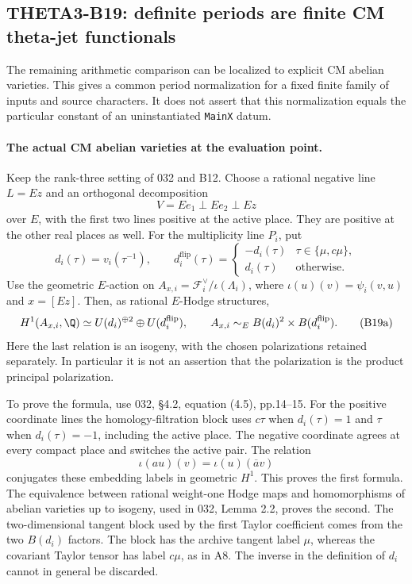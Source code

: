 \subsection{THETA3-B19: definite periods are finite CM theta-jet functionals}\label{B19}

The remaining arithmetic comparison can be localized to explicit CM
abelian varieties.  This gives a common period normalization for a
fixed finite family of inputs and source characters.  It does not
assert that this normalization equals the particular constant of an
uninstantiated \texttt{MainX} datum.

\paragraph{The actual CM abelian varieties at the evaluation point.}
Keep the rank-three setting of 032 and B12.  Choose a rational
negative line $L=Ez$ and an orthogonal decomposition
\[
 V=Ee_1\perp Ee_2\perp Ez
\]
over $E$, with the first two lines positive at the active place.
They are positive at the other real places as well.  For the
multiplicity line $P_i$, put
\[
 d_i(\tau)=v_i(\tau^{-1}),\qquad
 d_i^{\mathrm{flip}}(\tau)=
 \begin{cases}-d_i(\tau)&\tau\in\{\mu,c\mu\},\\
 d_i(\tau)&\text{otherwise}.
 \end{cases}
\]
Use the geometric $E$-action on
$A_{x,i}=\mathcal F_i^\vee/\iota(\Lambda_i)$, where
$\iota(u)(v)=\psi_i(v,u)$ and $x=[Ez]$.
Then, as rational $E$-Hodge structures,
\begin{equation}\label{B19-CM}
 H^1(A_{x,i},\Q)
 \simeq U(d_i)^{\oplus2}\oplus U(d_i^{\mathrm{flip}}),
 \qquad
 A_{x,i}\sim_E B(d_i)^2\times B(d_i^{\mathrm{flip}}).
 \tag{B19a}
\end{equation}
Here the last relation is an isogeny, with the chosen polarizations
retained separately.  In particular it is not an assertion that the
polarization is the product principal polarization.

To prove the formula, use 032, \S4.2, equation (4.5), pp.14--15.
For the positive coordinate lines the homology-filtration block
uses $c\tau$ when $d_i(\tau)=1$ and $\tau$ when
$d_i(\tau)=-1$, including the active place.  The negative
coordinate agrees at every compact place and switches the active
pair.  The relation
\[
 \iota(au)(v)=\iota(u)(\overline a v)
\]
conjugates these embedding labels in geometric $H^1$.
This proves the first formula.  The equivalence between rational
weight-one Hodge maps and homomorphisms of abelian varieties up to
isogeny, used in 032, Lemma 2.2, proves the second.
The two-dimensional tangent block used by the first Taylor
coefficient comes from the two $B(d_i)$ factors.  The block has
the archive tangent label $\mu$, whereas the covariant Taylor
tensor has label $c\mu$, as in A8.  The inverse in the definition
of $d_i$ cannot in general be discarded.

